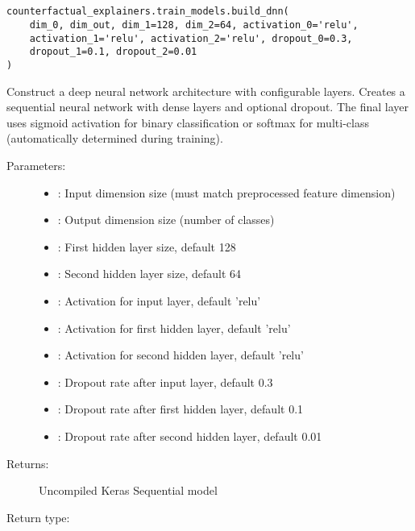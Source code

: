 \subsection{}
\label{func:build_dnn}

\begin{lstlisting}
counterfactual_explainers.train_models.build_dnn(
    dim_0, dim_out, dim_1=128, dim_2=64, activation_0='relu',
    activation_1='relu', activation_2='relu', dropout_0=0.3,
    dropout_1=0.1, dropout_2=0.01
)
\end{lstlisting}

Construct a deep neural network architecture with configurable layers. Creates a sequential neural network with dense layers and optional dropout. The final layer uses sigmoid activation for binary classification or softmax for multi-class (automatically determined during training).

\begin{description}
    \item[Parameters:]
        \begin{itemize}
            \item {}: Input dimension size (must match preprocessed feature dimension)
            \item {}: Output dimension size (number of classes)
            \item {}: First hidden layer size, default 128
            \item {}: Second hidden layer size, default 64
            \item {}: Activation for input layer, default 'relu'
            \item {}: Activation for first hidden layer, default 'relu'
            \item {}: Activation for second hidden layer, default 'relu'
            \item {}: Dropout rate after input layer, default 0.3
            \item {}: Dropout rate after first hidden layer, default 0.1
            \item {}: Dropout rate after second hidden layer, default 0.01
        \end{itemize}
    \item[Returns:] Uncompiled Keras Sequential model
    \item[Return type:]  %
\end{description}

